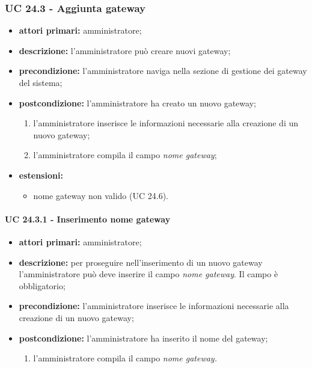 			\subsubsection{UC 24.3 - Aggiunta gateway}
			\begin{itemize}
				\item \textbf{attori primari:} amministratore;
				\item \textbf{descrizione:} l'amministratore può creare nuovi gateway;
				\item \textbf{precondizione:} l'amministratore naviga nella sezione di gestione dei gateway del sistema;
				\item \textbf{postcondizione:} l'amministratore ha creato un nuovo gateway;
				\begin{enumerate}
					\item{l'amministratore inserisce le informazioni necessarie alla creazione di un nuovo gateway;}
					\item{l'amministratore compila il campo \textit{nome gateway};}
				\end{enumerate} 
				\item \textbf{estensioni:}
				\begin{itemize}
					\item nome gateway non valido (UC 24.6).
				\end{itemize}
				
			\end{itemize}
				\paragraph{UC 24.3.1 - Inserimento nome gateway}
					\begin{itemize}
						\item \textbf{attori primari:} amministratore;
						\item \textbf{descrizione:} per proseguire nell'inserimento di un nuovo gateway l'amministratore può deve inserire il campo \textit{nome gateway}. Il campo è obbligatorio;
						\item \textbf{precondizione:} l'amministratore inserisce le informazioni necessarie alla creazione di un nuovo gateway;
						\item \textbf{postcondizione:} l'amministratore ha inserito il nome del gateway;
						\begin{enumerate}
							\item{l'amministratore compila il campo \textit{nome gateway.}}
						\end{enumerate} 
					\end{itemize}

